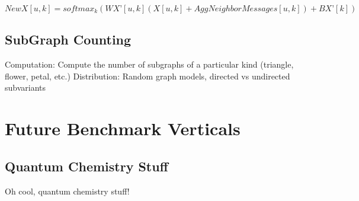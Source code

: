 \documentclass{article}
\begin{document}
$NewX[u, k] = softmax_k(WX’[u,k](X[u, k] +AggNeighborMessages[u,k]) + BX’[k]) $

\subsection{SubGraph Counting}
	Computation: Compute the number of subgraphs of a particular kind (triangle, flower, petal, etc.)
	Distribution: Random graph models, directed vs undirected subvariants

\section{Future Benchmark Verticals}

\subsection{Quantum Chemistry Stuff}
Oh cool, quantum chemistry stuff!



\end{document}
